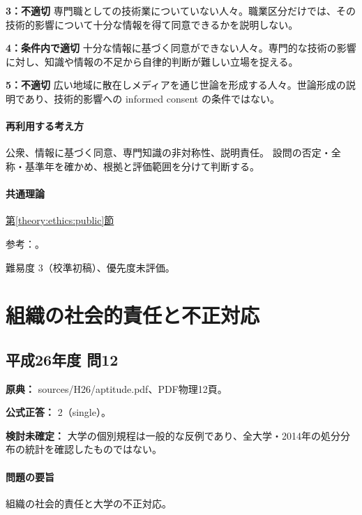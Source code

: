 \noindent\textbf{3：不適切} 専門職としての技術業についていない人々。職業区分だけでは、その技術的影響について十分な情報を得て同意できるかを説明しない。\par

\noindent\textbf{4：条件内で適切} 十分な情報に基づく同意ができない人々。専門的な技術の影響に対し、知識や情報の不足から自律的判断が難しい立場を捉える。\par

\noindent\textbf{5：不適切} 広い地域に散在しメディアを通じ世論を形成する人々。世論形成の説明であり、技術的影響への informed consent の条件ではない。\par

\paragraph{再利用する考え方} 公衆、情報に基づく同意、専門知識の非対称性、説明責任。 設問の否定・全称・基準年を確かめ、根拠と評価範囲を分けて判断する。

\paragraph{共通理論} \hyperref[theory:ethics:public]{第\ref*{theory:ethics:public}節}

\par 参考：\cite{scu_ethics_framework,ipej_ethics2011}。

\par 難易度 3（校準初稿）、優先度未評価。

\section{組織の社会的責任と不正対応}

\subsection{平成26年度 問12}
\label{q:h26-reg-apt-12}

\noindent\textbf{原典：} sources/H26/aptitude.pdf、PDF物理12頁。

\textbf{公式正答：} 2（single）。

\par\textbf{検討未確定：} 大学の個別規程は一般的な反例であり、全大学・2014年の処分分布の統計を確認したものではない。

\paragraph{問題の要旨} 組織の社会的責任と大学の不正対応。

